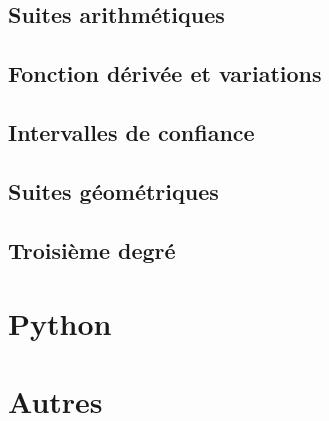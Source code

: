 \documentclass[a4paper,12pt]{book}
\begin{document}
\chapter{Suites arithmétiques}


\chapter{Fonction dérivée et variations}


\chapter{Intervalles de confiance}


\chapter{Suites géométriques}


\chapter{Troisième degré}


\part{Python}


\part{Autres}

%






\printindex
\end{document}

